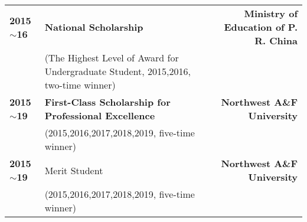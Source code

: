 \begin{longtable}[l]{@{}p{} p{} r}
    \textbf{2015$\sim$16} & \textbf{National Scholarship} & \textbf{Ministry of Education of P. R. China} \\
    & (The Highest Level of Award for Undergraduate Student, 2015,2016, two-time winner) & \\
    \textbf{2015$\sim$19} & \textbf{First-Class Scholarship for Professional Excellence} & \textbf{Northwest A\&F University} \\
    & (2015,2016,2017,2018,2019, five-time winner) & \\
    \textbf{2015$\sim$19} & Merit Student & \textbf{Northwest A\&F University} \\
    & (2015,2016,2017,2018,2019, five-time winner) & \\
\end{longtable}
